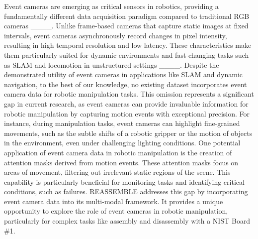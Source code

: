 Event cameras are emerging as critical sensors in robotics, providing a fundamentally different data acquisition paradigm compared to traditional RGB cameras ____. Unlike frame-based cameras that capture static images at fixed intervals, event cameras asynchronously record changes in pixel intensity, resulting in high temporal resolution and low latency. These characteristics make them particularly suited for dynamic environments and fast-changing tasks such as SLAM and locomotion in unstructured settings ____. Despite the demonstrated utility of event cameras in applications like SLAM and dynamic navigation, to the best of our knowledge, no existing dataset incorporates event camera data for robotic manipulation tasks. This omission represents a significant gap in current research, as event cameras can provide invaluable information for robotic manipulation by capturing motion events with exceptional precision. For instance, during manipulation tasks, event cameras can highlight fine-grained movements, such as the subtle shifts of a robotic gripper or the motion of objects in the environment, even under challenging lighting conditions. One potential application of event camera data in robotic manipulation is the creation of attention masks derived from motion events. These attention masks focus on areas of movement, filtering out irrelevant static regions of the scene. This capability is particularly beneficial for monitoring tasks and identifying critical conditions, such as failures. REASSEMBLE addresses this gap by incorporating event camera data into its multi-modal framework. It provides a unique opportunity to explore the role of event cameras in robotic manipulation, particularly for complex tasks like assembly and disassembly with a NIST Board \#1.